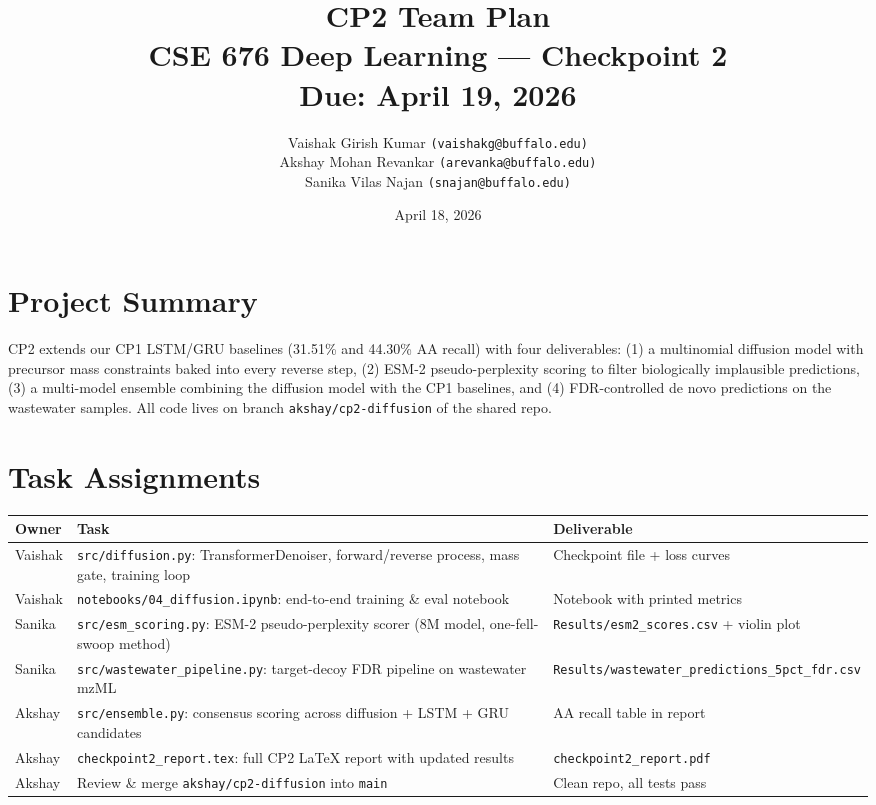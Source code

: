 \documentclass[11pt,letterpaper]{article}
\title{\textbf{CP2 Team Plan}\\
\large CSE 676 Deep Learning --- Checkpoint 2\\
\normalsize Due: April 19, 2026}
\author{
  Vaishak Girish Kumar \texttt{(vaishakg@buffalo.edu)}\\
  Akshay Mohan Revankar \texttt{(arevanka@buffalo.edu)}\\
  Sanika Vilas Najan \texttt{(snajan@buffalo.edu)}
}
\date{April 18, 2026}
\begin{document}
\maketitle
\tableofcontents
\newpage

\section{Project Summary}

CP2 extends our CP1 LSTM/GRU baselines (31.51\% and 44.30\% AA recall) with four deliverables:
(1) a multinomial diffusion model with precursor mass constraints baked into every reverse step,
(2) ESM-2 pseudo-perplexity scoring to filter biologically implausible predictions,
(3) a multi-model ensemble combining the diffusion model with the CP1 baselines,
and (4) FDR-controlled de novo predictions on the wastewater samples.
All code lives on branch \texttt{akshay/cp2-diffusion} of the shared repo.

\section{Task Assignments}

\begin{center}
\begin{tabular}{p{2.2cm} p{5cm} p{4.5cm}}
\toprule
\textbf{Owner} & \textbf{Task} & \textbf{Deliverable} \\
\midrule
Vaishak &
  \texttt{src/diffusion.py}: TransformerDenoiser, forward/reverse process, mass gate, training loop &
  Checkpoint file + loss curves \\
\addlinespace
Vaishak &
  \texttt{notebooks/04\_diffusion.ipynb}: end-to-end training \& eval notebook &
  Notebook with printed metrics \\
\addlinespace
Sanika &
  \texttt{src/esm\_scoring.py}: ESM-2 pseudo-perplexity scorer (8M model, one-fell-swoop method) &
  \texttt{Results/esm2\_scores.csv} + violin plot \\
\addlinespace
Sanika &
  \texttt{src/wastewater\_pipeline.py}: target-decoy FDR pipeline on wastewater mzML &
  \texttt{Results/wastewater\_predictions\_5pct\_fdr.csv} \\
\addlinespace
Akshay &
  \texttt{src/ensemble.py}: consensus scoring across diffusion + LSTM + GRU candidates &
  AA recall table in report \\
\addlinespace
Akshay &
  \texttt{checkpoint2\_report.tex}: full CP2 LaTeX report with updated results &
  \texttt{checkpoint2\_report.pdf} \\
\addlinespace
Akshay &
  Review \& merge \texttt{akshay/cp2-diffusion} into \texttt{main} &
  Clean repo, all tests pass \\
\bottomrule
\end{tabular}
\end{center}
\end{document}
